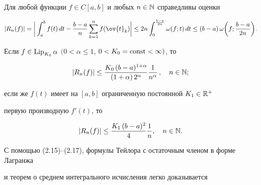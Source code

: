 \begin{lems}


Для любой функции $f\in C[a,b]$ и любых $n\in \Bbb N$ справедливы оценки 


\begin{equation}


|R_n(f)|=\bigg| \intl_a^bf(t)\, dt -\frac{b-a}{n}\sum_{k=1}^n


f(\ov{t}_k)\bigg|\leq 


%


2n\intl_0^{\frac{b-a}{2n}} \omega(f;t)\, dt\leq (b-a)\,


\omega\bigg(f;\frac{b-a}{2n}\bigg).


\end{equation}


\end{lems}





\begin{cornonum}


Если $f\in\Lip_{K_0}\alpha$ $(0<\alpha \leq 1$, $0<K_0=


\const <\infty)$, то


\begin{equation}


|R_n(f)|\leq \frac{K_0\, (b-a)^{1+\alpha}}{(1+\alpha)\, 2^\alpha}


\frac{1}{n^\alpha}\, ,\quad n\in \bl{N};


\end{equation}


если же $f(t)$ имеет на $[a,b]$ ограниченную постоянной $K_1\in \Bbb{R}^+$


первую производную $f'(t)$, то


\begin{equation}


|R_n(f)|\leq \frac{K_1\, (b-a)^2}{4}\frac{1}{n}, \quad n\in \bl{N}.


\end{equation}


\end{cornonum}





С помощью (2.15)--(2.17), формулы Тейлора с остаточным членом в форме Лагранжа


и теорем о среднем интегрального исчисления легко доказывается





